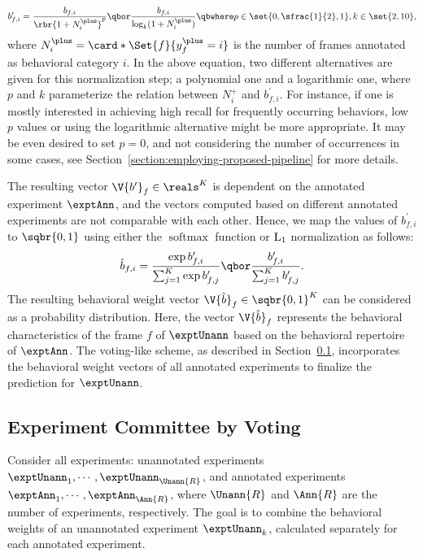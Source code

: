 \begin{equation}\label{equation:behavioral-weight-occurence-normalization}
	b^\prime_{f,i} = \frac{b_{f,i}}{\rbr{1 + N^{\plus}_i}^p} \qbor \frac{b_{f,i}}{\log_k(1 + N^{\plus}_i)} \qbwhere p \in \set{0, \sfrac{1}{2}, 1}, k \in \set{2, 10},
\end{equation}
where $N^{\plus}_i = \card*{\Set{f}{y^{\plus}_f=i}}$ is the number of frames annotated as behavioral category $i$.
In the above equation, two different alternatives are given for this normalization step; a polynomial one and a logarithmic one, where $p$ and $k$ parameterize the relation between $N^{\plus}_i$ and $b^\prime_{f,i}$.
For instance, if one is mostly interested in achieving high recall for frequently occurring behaviors, low $p$ values or using the logarithmic alternative might be more appropriate.
It may be even desired to set $p=0$, and not considering the number of occurrences in some cases, see Section~\ref{section:employing-proposed-pipeline} for more details.

The resulting vector $\V{b^{\prime}}_f \in \reals^K$ is dependent on the annotated experiment $\exptAnn$, and the vectors computed based on different annotated experiments are not comparable with each other.
Hence, we map the values of $b^\prime_{f,i}$ to $\sqbr{0,1}$ using either the $\operatorname {softmax}$ function or $\textnormal{L}_1$ normalization as follows:
\begin{equation}\label{equation:behavioral-weight-activation}
	\hat{b}_{f,i} = \frac{\exp{b^\prime_{f,i}}}{\sum_{j=1}^{K} \exp{b^\prime_{f,j}}} \qbor \frac{b^\prime_{f,i}}{\sum_{j=1}^{K} b^\prime_{f,j}}.
\end{equation}
The resulting behavioral weight vector $\V{\hat{b}}_f \in \sqbr{0,1}^K$ can be considered as a probability distribution.
Here, the vector $\V{\hat{b}}_f$ represents the behavioral characteristics of the frame $f$ of $\exptUnann$ based on the behavioral repertoire of $\exptAnn$.
The voting-like scheme, as described in Section~\ref{section:committee-by-voting}, incorporates the behavioral weight vectors of all annotated experiments to finalize the prediction for $\exptUnann$.

\subsection{Experiment Committee by Voting}\label{section:committee-by-voting}
Consider all experiments: unannotated experiments $\exptUnann_1, \cdots, \exptUnann_{\Unann{R}}$, and annotated experiments $\exptAnn_1, \cdots, \exptAnn_{\Ann{R}}$, where $\Unann{R}$ and $\Ann{R}$ are the number of experiments, respectively.
The goal is to combine the behavioral weights of an unannotated experiment $\exptUnann_k$, calculated separately for each annotated experiment.

